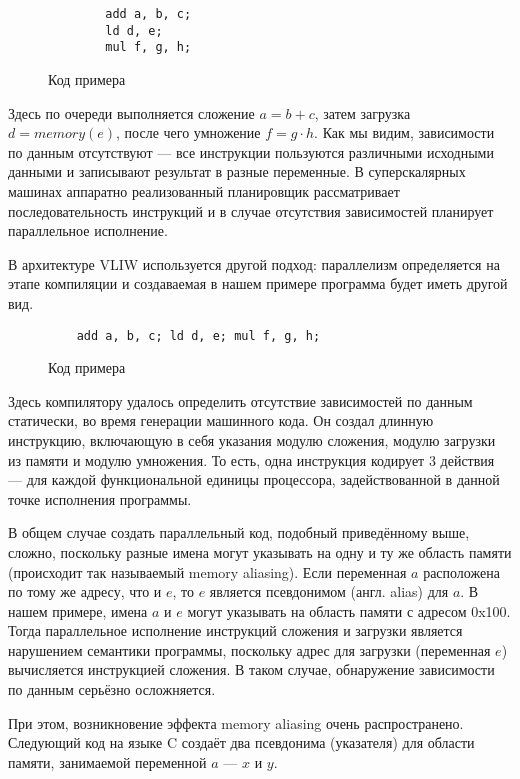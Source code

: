 \begin{figure}[H]
    \begin{verbatim}
        add a, b, c;
        ld d, e; 
        mul f, g, h;
    \end{verbatim}
    \label{fig:ilp}
    \caption{Код примера}
\end{figure}

Здесь по очереди выполняется сложение $a = b + c$, затем загрузка $d = memory(e)$, после чего умножение $f = g \cdot h$. Как мы видим, зависимости по данным отсутствуют --- все инструкции пользуются различными исходными данными и записывают результат в разные переменные. В суперскалярных машинах аппаратно реализованный планировщик рассматривает последовательность инструкций и в случае отсутствия зависимостей планирует параллельное исполнение.

В архитектуре VLIW используется другой подход: параллелизм определяется на этапе компиляции и создаваемая в нашем примере программа будет иметь другой вид.

\begin{figure}[H]
    \begin{verbatim}
    add a, b, c; ld d, e; mul f, g, h;
    \end{verbatim}
    \label{fig:vliw}
    \caption{Код примера}
\end{figure}

Здесь компилятору удалось определить отсутствие зависимостей по данным статически, во время генерации машинного кода. Он создал длинную инструкцию, включающую в себя указания модулю сложения, модулю загрузки из памяти и модулю умножения. То есть, одна инструкция кодирует 3 действия --- для каждой функциональной единицы процессора, задействованной в данной точке исполнения программы.

В общем случае создать параллельный код, подобный приведённому выше, сложно, поскольку разные имена могут указывать на одну и ту же область памяти (происходит так называемый memory aliasing). Если переменная $a$ расположена по тому же адресу, что и $e$, то $e$ является псевдонимом (англ. alias) для $a$. В нашем примере, имена $a$ и $e$ могут указывать на область памяти с адресом 0x100. Тогда параллельное исполнение инструкций сложения и загрузки является нарушением семантики программы, поскольку адрес для загрузки (переменная $e$) вычисляется инструкцией сложения. В таком случае, обнаружение зависимости по данным серьёзно осложняется.

При этом, возникновение эффекта memory aliasing очень распространено. Следующий код на языке C создаёт два псевдонима (указателя) для области памяти, занимаемой переменной $a$ --- $x$ и $y$.

